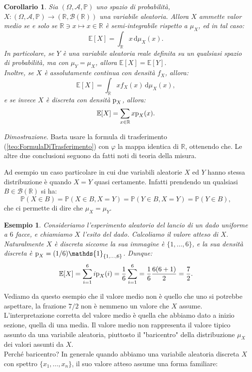 \documentclass[11pt]{book}
\makeatletter
\theoremstyle{Definizione}
\theoremstyle{TeoremaProposizioneLemmaCorollario}
\newtheorem{mycor}[myteo]{Corollario}
\theoremstyle{OsservazioneNota}
\newtheorem{myes}{Esempio}[section]
\renewenvironment{proof}[1][\proofname]{\par
  \normalfont \topsep6\p@\@plus6\p@\relax
  \trivlist
  \item[\hskip\labelsep
        \itshape
    #1\@addpunct{.}]\ignorespaces
}{%
  \endtrivlist\@endpefalse
}
\newcommand{\R}{\mathbb{R}}
\renewcommand{\P}{\mathbb{P}}
\renewcommand{\d}{\mathrm{d}}
\newcommand{\p}{\textup{p}}
\newcommand{\E}{\mathbb{E}}
\newcommand{\uno}[1]{\mathds{1}_{#1}}
\renewenvironment{proof}{\textsl{Dimostrazione}.}{}
\makeatother
\begin{document}
\begin{boxoss}
\begin{mycor}
Sia $(\Omega,\mathcal{A},\P)$ uno spazio di probabilità, $X:(\Omega,\mathcal{A},\P)\longrightarrow ({\R},\mathcal{B}({\R}))$ una variabile aleatoria. Allora $X$ ammette valor medio se e solo se $\R\ni x \longmapsto x\in \R$ è semi-integrabile rispetto a $\mu_X$, ed in tal caso:
$$
\E[X] = \int_\R x \,\d\mu_X(x).
$$
In particolare, se $Y$ è una variabile aleatoria reale definita su un qualsiasi spazio di probabilità, ma con $\mu_Y = \mu_X$, allora $\E[X] = \E[Y]$.\\
Inoltre, se $X$ è assolutamente continua con densità $f_X$, allora:
$$
\E[X] = \int_\R xf_X(x)\,\d\mu_X(x),
$$
e se invece $X$ è discreta con densità $\p_X$, allora:
$$
\E[X] = \sum_{x\in \R} x\p_X(x).
$$
\end{mycor}
\tcblower
\begin{proof}
Basta usare la formula di trasferimento (\ref{teo:FormulaDiTrasferimento}) con $\varphi$ la mappa identica di $\R$, ottenendo che. Le altre due conclusioni seguono da fatti noti di teoria della misura.
\end{proof}
\end{boxoss}
\noindent
Ad esempio un caso particolare in cui due variabili aleatorie $X$ ed $Y$ hanno stessa distribuzione è quando $X = Y$ quasi certamente. Infatti prendendo un qualsiasi $B\in \mathcal{B}(\R)$ si ha:
$$
\P(X\in B) = \P(X\in B, X = Y) = \P(Y\in B, X = Y) = \P(Y\in B),
$$
che ci permette di dire che $\mu_X = \mu_Y$.
\begin{myes}
Consideriamo l'esperimento aleatorio del lancio di un dado uniforme a $6$ facce, e chiamiamo $X$ l'esito del dado. Calcoliamo il valore atteso di $X$.\\
Naturalmente $X$ è discreta siccome la sua immagine è $\{1,\dots,6\}$, e la sua densità discreta è $\p_X = (1/6) \uno{\{1,\dots,6\}}$. Dunque:
$$
\E[X] = \sum_{i = 1}^6 i \p_X(i) = \frac{1}{6}\sum_{i = 1}^6 = \frac{1}{6}\frac{6(6+1)}{2} = \frac{7}{2}.
$$
\end{myes}
Vediamo da questo esempio che il valore medio non è quello che uno si potrebbe aspettare, la frazione $7/2$ non è nemmeno un valore che $X$ assume. L'interpretazione corretta del valore medio è quella che abbiamo dato a inizio sezione, quella di una media. Il valore medio non rappresenta il valore tipico assunto da una variabile aleatoria, piuttosto il "baricentro" della distribuzione $\mu_X$ dei valori assunti da $X$.\\
Perché baricentro? In generale quando abbiamo una variabile aleatoria discreta $X$ con spettro $\{x_1,\dots,x_n\}$, il suo valore atteso assume una forma familiare:
\end{document}
